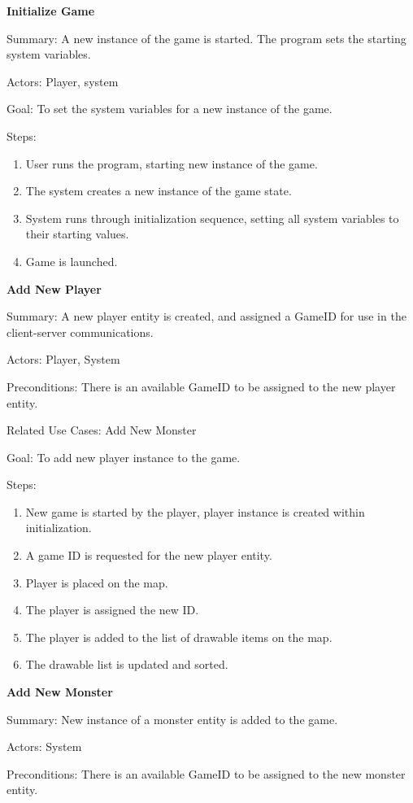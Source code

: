 \documentclass[12pt]{report}
\begin{document}
\textbf{Initialize Game}

Summary: A new instance of the game is started. The program sets the starting system variables.

Actors: Player, system

Goal: To set the system variables for a new instance of the game.

Steps:
\begin{enumerate}
	\item User runs the program, starting new instance of the game.
	\item The system creates a new instance of the game state.
	\item System runs through initialization sequence, setting all system variables to their starting values.
	\item Game is launched.
\end{enumerate}

\textbf{Add New Player}

Summary: A new player entity is created, and assigned a GameID for use in the client-server communications.

Actors: Player, System

Preconditions: There is an available GameID to be assigned to the new player entity.

Related Use Cases: Add New Monster

Goal: To add new player instance to the game.

Steps:
\begin{enumerate}
	\item New game is started by the player, player instance is created within initialization.
	\item A game ID is requested for the new player entity.
	\item Player is placed on the map.
	\item The player is assigned the new ID.
	\item The player is added to the list of drawable items on the map.
	\item The drawable list is updated and sorted.
\end{enumerate}

\textbf{Add New Monster} 

Summary: New instance of a monster entity is added to the game. 

Actors: System

Preconditions: There is an available GameID to be assigned to the new monster entity.
\end{document}
